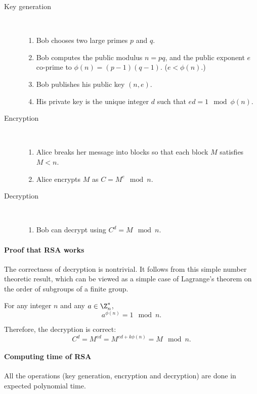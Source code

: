 \documentclass[a4paper, 11pt, openany]{book}
\begin{document}
\begin{description}
\item[Key generation]~
\begin{enumerate}
    \item Bob chooses two large primes $p$ and $q$.

    \item Bob computes the public modulus $n = pq$, and the public exponent $e$ co-prime to $\phi(n) = (p-1)(q-1)$. ($e< \phi(n)$.)

    \item Bob publishes his public key $(n,e)$.

    \item His private key is the unique integer $d$ such that $ed = 1 \mod \phi(n)$.
\end{enumerate}

\item [Encryption]~
\begin{enumerate}
    \item Alice breaks her message into blocks so that each block $M$ satisfies $M<n$.

    \item Alice encrypts $M$ as $C = M^e \mod n$.
\end{enumerate}

\item[Decryption]~
\begin{enumerate}
    \item Bob can decrypt using $C^d = M \mod n$.
\end{enumerate}
\end{description}


\paragraph{Proof that RSA works}
The correctness of decryption is nontrivial. It follows from this simple number theoretic result, which can be viewed as a simple case of Lagrange's theorem on the order of subgroups of a finite group.

\begin{theorem}
For any integer $n$ and any $a \in \Z_n^*$,
\[
    a^{\phi(n)} = 1 \mod n.
\]
\end{theorem}
Therefore, the decryption is correct:
\[
    C^d = M^{ed} = M^{ed + k \phi(n)} = M \mod n.
\]


\paragraph{Computing time of RSA}
All the operations (key generation, encryption and decryption) are done in expected polynomial time.
\end{document}
